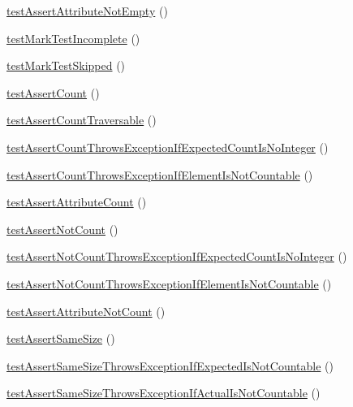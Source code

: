 \begin{DoxyCompactItemize}
\mbox{\hyperlink{class_framework___assert_test_ad5528f4ef65a5a0040c44652077905e0}{test\+Assert\+Attribute\+Not\+Empty}} ()
\item 
\mbox{\hyperlink{class_framework___assert_test_abb12ec202609e531498af965173da49f}{test\+Mark\+Test\+Incomplete}} ()
\item 
\mbox{\hyperlink{class_framework___assert_test_a649443b2dab3d3471367be98d819f879}{test\+Mark\+Test\+Skipped}} ()
\item 
\mbox{\hyperlink{class_framework___assert_test_a27919a9ae152d1541f464e46c0ccfcfa}{test\+Assert\+Count}} ()
\item 
\mbox{\hyperlink{class_framework___assert_test_a855f75b41bdfb86d5895c9cd87b745f6}{test\+Assert\+Count\+Traversable}} ()
\item 
\mbox{\hyperlink{class_framework___assert_test_a0d753579831217d6e4f2841507c1d552}{test\+Assert\+Count\+Throws\+Exception\+If\+Expected\+Count\+Is\+No\+Integer}} ()
\item 
\mbox{\hyperlink{class_framework___assert_test_a08cb4757026537f31c4b955000baad8e}{test\+Assert\+Count\+Throws\+Exception\+If\+Element\+Is\+Not\+Countable}} ()
\item 
\mbox{\hyperlink{class_framework___assert_test_adf71bc09bbdb881bc5f5d715f3e69211}{test\+Assert\+Attribute\+Count}} ()
\item 
\mbox{\hyperlink{class_framework___assert_test_a63a73d049f2f8e294b751879ddd72a06}{test\+Assert\+Not\+Count}} ()
\item 
\mbox{\hyperlink{class_framework___assert_test_ab7016f656917c1f199252f07bd709c90}{test\+Assert\+Not\+Count\+Throws\+Exception\+If\+Expected\+Count\+Is\+No\+Integer}} ()
\item 
\mbox{\hyperlink{class_framework___assert_test_ad680d68d7d4e2ad817f67e1850b427cd}{test\+Assert\+Not\+Count\+Throws\+Exception\+If\+Element\+Is\+Not\+Countable}} ()
\item 
\mbox{\hyperlink{class_framework___assert_test_a8bbd8068c75f53032589bff5f57f0b57}{test\+Assert\+Attribute\+Not\+Count}} ()
\item 
\mbox{\hyperlink{class_framework___assert_test_aaf456780b57fb62b476fc7d154b0a1e2}{test\+Assert\+Same\+Size}} ()
\item 
\mbox{\hyperlink{class_framework___assert_test_aa7ac326dde7f1a7508feaf92397d88b1}{test\+Assert\+Same\+Size\+Throws\+Exception\+If\+Expected\+Is\+Not\+Countable}} ()
\item 
\mbox{\hyperlink{class_framework___assert_test_a092a79f2578f78d7222ba0188eed4799}{test\+Assert\+Same\+Size\+Throws\+Exception\+If\+Actual\+Is\+Not\+Countable}} ()

\end{DoxyCompactItemize}
